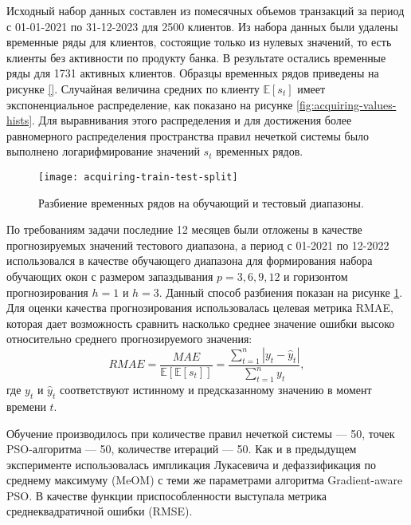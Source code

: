 Исходный набор данных составлен из помесячных объемов транзакций за период с 01-01-2021 по 31-12-2023 для 2500 клиентов. Из набора данных были удалены временные ряды для клиентов, состоящие только из нулевых значений, то есть клиенты без активности по продукту банка. В результате остались временные ряды для 1731 активных клиентов. Образцы временных рядов приведены на рисунке \ref{}. Случайная величина средних по клиенту $\mathbb{E}[s_t]$ имеет экспоненциальное распределение, как показано на рисунке \cref{fig:acquiring-values-hists}. Для выравнивания этого распределения и для достижения более равномерного распределения пространства правил нечеткой системы было выполнено логарифмирование значений $s_t$ временных рядов.

\begin{figure}[ht]
	\centering
	\texttt{[image: acquiring-train-test-split]}
	\caption{Разбиение временных рядов на обучающий и тестовый диапазоны.}
	\label{fig:acquiring-train-test-split}
\end{figure}

По требованиям задачи последние 12 месяцев были отложены в качестве прогнозируемых значений тестового диапазона, а период с 01-2021 по 12-2022 использовался в качестве обучающего диапазона для формирования набора обучающих окон с размером запаздывания $p = 3,6,9,12$ и горизонтом прогнозирования $h=1$ и $h=3$. Данный способ разбиения показан на рисунке \cref{fig:acquiring-train-test-split}. Для оценки качества прогнозирования использовалась целевая метрика RMAE, которая дает возможность сравнить насколько среднее значение ошибки высоко относительно среднего прогнозируемого значения:
\[
RMAE = \frac{MAE}{\mathbb{E}[\mathbb{E}[s_t]]} = \frac{\sum_{t=1}^n |y_t - \hat{y}_t|}{\sum_{t=1}^n y_t},
\]
где $y_t$ и $\hat{y}_t$ соответствуют истинному и предсказанному значению в момент времени $t$.

Обучение производилось при количестве правил нечеткой системы --- 50, точек PSO-алгоритма --- 50, количестве итераций --- 50. Как и в предыдущем эксперименте использовалась импликация Лукасевича и дефаззификация по среднему максимуму (MeOM) с теми же параметрами алгоритма Gradient-aware PSO. В качестве функции приспособленности выступала метрика среднеквадратичной ошибки (RMSE).


